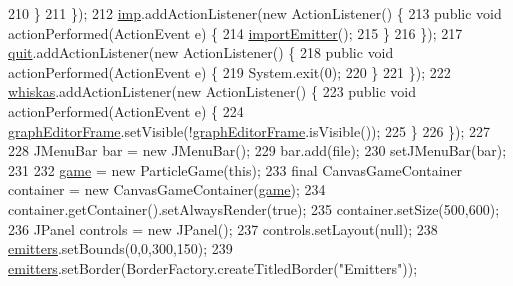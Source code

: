 \begin{DoxyCode}
210             \}
211         \});
212         \mbox{\hyperlink{classorg_1_1newdawn_1_1slick_1_1tools_1_1peditor_1_1_particle_editor_a0390da399423359c2c2a9eb9a859dfa9}{imp}}.addActionListener(\textcolor{keyword}{new} ActionListener() \{
213             \textcolor{keyword}{public} \textcolor{keywordtype}{void} actionPerformed(ActionEvent e) \{
214                 \mbox{\hyperlink{classorg_1_1newdawn_1_1slick_1_1tools_1_1peditor_1_1_particle_editor_a8afbd02f370ac64f0b5b3ec8e985c0ca}{importEmitter}}();
215             \}
216         \});
217         \mbox{\hyperlink{classorg_1_1newdawn_1_1slick_1_1tools_1_1peditor_1_1_particle_editor_ad7c648f5dd388a57f8c61029e77a48a6}{quit}}.addActionListener(\textcolor{keyword}{new} ActionListener() \{
218             \textcolor{keyword}{public} \textcolor{keywordtype}{void} actionPerformed(ActionEvent e) \{
219                 System.exit(0);
220             \}
221         \});
222         \mbox{\hyperlink{classorg_1_1newdawn_1_1slick_1_1tools_1_1peditor_1_1_particle_editor_a4bfcec4ac290637e5f038a4c83603b6d}{whiskas}}.addActionListener(\textcolor{keyword}{new} ActionListener() \{
223             \textcolor{keyword}{public} \textcolor{keywordtype}{void} actionPerformed(ActionEvent e) \{
224                 \mbox{\hyperlink{classorg_1_1newdawn_1_1slick_1_1tools_1_1peditor_1_1_particle_editor_a9af7e0bdb25c87f134a7bd1b81585a29}{graphEditorFrame}}.setVisible(!\mbox{\hyperlink{classorg_1_1newdawn_1_1slick_1_1tools_1_1peditor_1_1_particle_editor_a9af7e0bdb25c87f134a7bd1b81585a29}{graphEditorFrame}}.isVisible());
225             \}
226         \});
227         
228         JMenuBar bar = \textcolor{keyword}{new} JMenuBar();
229         bar.add(file);
230         setJMenuBar(bar);
231         
232         \mbox{\hyperlink{classorg_1_1newdawn_1_1slick_1_1tools_1_1peditor_1_1_particle_editor_a30ffb1c9b34c421c0ef6a28efbaaa450}{game}} = \textcolor{keyword}{new} ParticleGame(\textcolor{keyword}{this});
233         \textcolor{keyword}{final} CanvasGameContainer container = \textcolor{keyword}{new} CanvasGameContainer(\mbox{\hyperlink{classorg_1_1newdawn_1_1slick_1_1tools_1_1peditor_1_1_particle_editor_a30ffb1c9b34c421c0ef6a28efbaaa450}{game}});
234         container.getContainer().setAlwaysRender(\textcolor{keyword}{true});
235         container.setSize(500,600);
236         JPanel controls = \textcolor{keyword}{new} JPanel();
237         controls.setLayout(null);
238         \mbox{\hyperlink{classorg_1_1newdawn_1_1slick_1_1tools_1_1peditor_1_1_particle_editor_adf3a8d24a0adf9e68e06a87f37ff378a}{emitters}}.setBounds(0,0,300,150);
239         \mbox{\hyperlink{classorg_1_1newdawn_1_1slick_1_1tools_1_1peditor_1_1_particle_editor_adf3a8d24a0adf9e68e06a87f37ff378a}{emitters}}.setBorder(BorderFactory.createTitledBorder(\textcolor{stringliteral}{"Emitters"}));

\end{DoxyCode}
